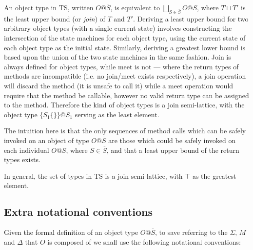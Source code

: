 \documentclass[preprint]{sigplanconf}
\begin{document}



An object type in TS, written $O@\overline{S}$, is equivalent to
$\bigsqcup_{S \in \overline{S}} O@S$, where $T \sqcup T'$ is the least upper
bound (or {\it join}) of $T$ and $T'$. Deriving a least upper bound for
two arbitrary object types (with a single current state) 
involves constructing the intersection of the state machines for each object 
type, using the current state of each object type as the initial state.
Similarly, deriving a greatest lower bound is based upon the union of
the two state machines in the same fashion. Join is always defined for
object types, while meet is not --- where the return types of methods are
incompatible (i.e. no join/meet exists respectively), a join operation will 
discard the method (it is unsafe to
call it) while a meet operation would require that the method be callable,
however no valid return type can be assigned to the method. Therefore
the kind of object types is a join semi-lattice, with the object type 
$\{ S_1 \{\} \}@S_1$ serving as the least element. 

The intuition here is that the only sequences of method calls which can be 
safely invoked on an object of type $O@\overline{S}$ are those which could be 
safely invoked on each individual $O@S$, where $S \in \overline{S}$, and that
a least upper bound of the return types exists.

In general, the set of
types in TS is a join semi-lattice, with $\top$ as the greatest element.

\subsection{Extra notational conventions}

Given the formal definition of an object type $O@\overline{S}$, to save
referring to the $\Sigma$, $M$ and $\Delta$ that $O$ is composed of we shall
use the following notational conventions:
\end{document}
